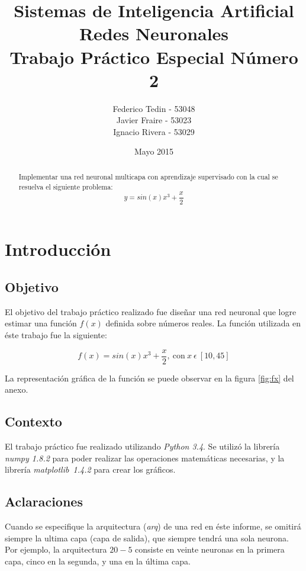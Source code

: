 \documentclass[12pt,a4paper]{article}
\title{Sistemas de Inteligencia Artificial\\Redes Neuronales\\Trabajo Práctico Especial Número 2}
\date{Mayo 2015}
\author{Federico Tedin - 53048\\Javier Fraire - 53023\\Ignacio Rivera - 53029}
\begin{document}
\maketitle
\thispagestyle{empty}

\vspace{5mm}
\renewcommand{\abstractname}{Resumen:}
\begin{abstract}

\centering
Implementar una red neuronal multicapa con aprendizaje supervisado con la cual se resuelva el siguiente problema:
$$ y = sin(x)x^3 + \frac{x}{2} $$
\end{abstract}

\clearpage

\renewcommand{\contentsname}{Índice}
\tableofcontents
\thispagestyle{empty}
\clearpage
\setcounter{page}{1}


\section{Introducción}
\subsection{Objetivo}

El objetivo del trabajo práctico realizado fue diseñar una red neuronal que logre estimar una función $f(x)$ definida sobre números reales.  La función utilizada en éste trabajo fue la siguiente:

$$ f(x) = sin(x)x^3 + \frac{x}{2}, \ \text{con} \ x \ \epsilon \ [10, 45] $$

La representación gráfica de la función se puede observar en la figura \ref{fig:fx} del anexo.

\subsection{Contexto}

El trabajo práctico fue realizado utilizando \emph{Python 3.4}.  Se utilizó la librería \emph{numpy 1.8.2} para poder realizar las operaciones matemáticas necesarias, y la librería \emph{matplotlib\ 1.4.2} para crear los gráficos.

\subsection{Aclaraciones}

Cuando se especifique la arquitectura (\emph{arq}) de una red en éste informe, se omitirá siempre la ultima capa (capa de salida), que siempre tendrá una sola neurona.  Por ejemplo, la arquitectura $20-5$ consiste en veinte neuronas en la primera capa, cinco en la segunda, y una en la última capa.
\end{document}
